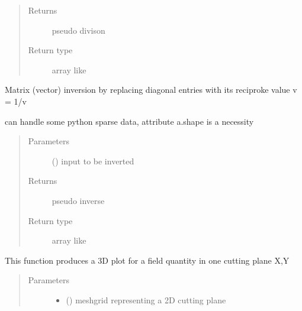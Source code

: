 \documentclass[letterpaper,10pt,english]{sphinxmanual}
\begin{document}
\begin{fulllineitems}
\begin{fulllineitems}
\begin{quote}
\begin{description}
\begin{itemize}
\end{itemize}

\item[{Returns}] \leavevmode
pseudo divison

\item[{Return type}] \leavevmode
array like

\end{description}\end{quote}

\end{fulllineitems}


\begin{fulllineitems}
\label{\detokenize{FIT:FIT.FIT.nullinv}}
Matrix (vector) inversion by replacing diagonal entries with its reciproke value v = 1/v

can handle some python sparse data, attribute a.shape is a necessity
\begin{quote}\begin{description}
\item[{Parameters}] \leavevmode
{} () \textendash{} input to be inverted

\item[{Returns}] \leavevmode
pseudo inverse

\item[{Return type}] \leavevmode
array like

\end{description}\end{quote}

\end{fulllineitems}


\begin{fulllineitems}
\label{\detokenize{FIT:FIT.FIT.plotField}}
This function produces a 3D plot for a field quantity in one cutting plane X,Y
\begin{quote}\begin{description}
\item[{Parameters}] \leavevmode\begin{itemize}
\item {} 
\sphinxstyleliteralstrong{\sphinxupquote{,}} () \textendash{} meshgrid representing a 2D cutting plane


\end{itemize}
\end{description}
\end{quote}
\end{fulllineitems}
\end{fulllineitems}
\end{document}

